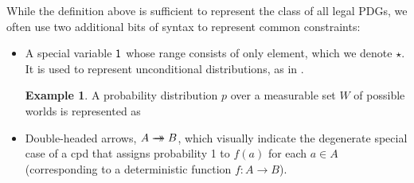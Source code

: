 \documentclass{article}
\theoremstyle{plain}
\theoremstyle{definition}
\newtheorem{examplex}{Example}
\theoremstyle{remark}
\newcommand{\tto}{%
	\rightarrow\mathrel{\mspace{-15mu}}\rightarrow}
\newcommand{\MN}{PDG}
\newcommand{\MNs}{\MN s}
\numberwithin{equation}{section}
\begin{document}
	While the definition above is sufficient to represent the class of all legal \MNs,
	we often use two additional bits of syntax to represent common constraints:  
	\begin{itemize}
	\item A special variable $\sf 1$ 
whose range consists of only element, which we denote $\star$.
It is used to represent
          unconditional distributions, as in
                  .  
	\begin{vleftovers}
		\begin{examplex}\label{ex:worldsonly}
			A probability distribution $p$ over a measurable set $W$ of possible worlds is represented as 
			\begin{center}
			\end{center}
		\end{examplex}
	\end{vleftovers}
		\item Double-headed arrows, $A \tto
                  B$, which visually indicate the degenerate special
                  case of a cpd that assigns probability 1 to $f(a)$
                  for each $a \in A$ (corresponding to a deterministic
                  function $f : A \to B$). 
	\end{itemize}
\end{document}
